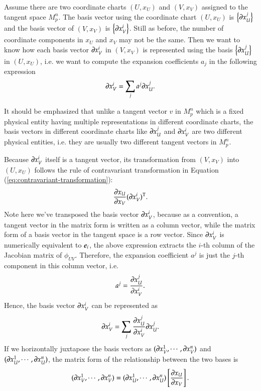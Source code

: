 \documentclass[11pt, a4paper]{book}
\begin{document}
Assume there are two coordinate charts $(U,x_U)$ and $(V,x_V)$ assigned to the tangent
space $M_p^n$. The basis vector using the coordinate chart $(U,x_U)$ is
$\left\{ \boldsymbol{\partial}x_U^j \right\}$ and the basis vector of $(V,x_V)$ is
$\left\{ \boldsymbol{\partial}x_V^i \right\}$. Still as before, the number of coordinate
components in $x_U$ and $x_V$ may not be the same. Then we want to know how each basis
vector $\boldsymbol{\partial}x_V^i$ in $(V,x_V)$ is represented using the basis
$\left\{ \boldsymbol{\partial}x_U^j \right\}$ in $(U,x_U)$, i.e. we want to compute the expansion
coefficients $a_j$ in the following expression
\begin{equation*}
  \boldsymbol{\partial}x_V^i = \sum_j a^j \boldsymbol{\partial}x_U^j.
\end{equation*}
\begin{Remark}
  It should be emphasized that unlike a tangent vector $v$ in $M_p^n$ which is a fixed physical
  entity having multiple representations in different coordinate charts, the basis vectors
  in different coordinate charts like $\boldsymbol{\partial}x_U^j$ and $\boldsymbol{\partial}x_V^i$ are
  two different physical entities, i.e. they are usually two different tangent vectors in
  $M_p^n$.
\end{Remark}

Because $\boldsymbol{\partial}x_V^i$ itself is a tangent vector, its transformation from $(V,x_V)$
into $(U,x_U)$ follows the rule of contravariant transformation in Equation
(\ref{eq:contravariant-transformation}):
\begin{equation*}
  \frac{\partial x_U}{\partial x_V} (\boldsymbol{\partial}x_V^i)^{\mathrm{T}}.
\end{equation*}
Note here we've transposed the basis vector $\boldsymbol{\partial}x_V^i$, because as a convention,
a tangent vector in the matrix form is written as a column vector, while the matrix form
of a basis vector in the tangent space is a row vector. Since $\boldsymbol{\partial}x_V^i$ is
numerically equivalent to $\boldsymbol{e}_i$, the above expression extracts the $i$-th column of
the Jacobian matrix of $\phi_{UV}$. Therefore, the expansion coefficient $a^{j}$ is just the
$j$-th component in this column vector, i.e.
\begin{equation}
  a^j = \frac{\partial x_U^j}{\partial x_V^i}.
\end{equation}
Hence, the basis vector $\boldsymbol{\partial}x_V^i$ can be represented as
\begin{equation}
  \label{eq:tangent-vector-basis-relation}
  \boldsymbol{\partial}x_V^i = \sum_j \frac{\partial x_U^j}{\partial x_V^i} \boldsymbol{\partial}x_U^j.
\end{equation}
If we horizontally juxtapose the basis vectors as
$(\boldsymbol{\partial}x_V^1,\cdots,\boldsymbol{\partial}x_V^n)$ and
$(\boldsymbol{\partial}x_U^1,\cdots,\boldsymbol{\partial}x_U^n)$, the matrix form of the
relationship between the two bases is
\begin{equation}
  \label{eq:tangent-space-bases-relation}
  (\boldsymbol{\partial}x_V^1,\cdots,\boldsymbol{\partial}x_V^n) =
  (\boldsymbol{\partial}x_U^1,\cdots,\boldsymbol{\partial}x_U^n) \left[ \frac{\partial x_U}{\partial x_V} \right].
\end{equation}
\end{document}
